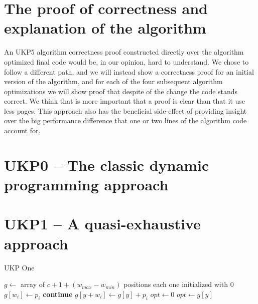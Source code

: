 \documentclass[12pt]{article}
\begin{document}
\section{The proof of correctness and explanation of the algorithm}

An UKP5 algorithm correctness proof constructed directly over the algorithm optimized final code would be, in our opinion, hard to understand. We chose to follow a different path, and we will instead show a correctness proof for an initial version of the algorithm, and for each of the four subsequent algorithm optimizations we will show proof that despite of the change the code stands correct. We think that is more important that a proof is clear than that it use less pages. This approach also has the beneficial side-effect of providing insight over the big performance difference that one or two lines of the algorithm code account for.

\section{UKP0 -- The classic dynamic programming approach}

\section{UKP1 -- A quasi-exhaustive approach}

\begin{algorithm}
\caption{UKP One}\label{alg:ukp1}
\begin{algorithmic}[1]
  \State \(g \gets\) array of \(c + 1 + (w_{max} - w_{min})\) positions each one initialized with \(0\)\label{ukp1:create_g}
  \State %
  \label{begin_trivial_bounds}
      \State \(g[w_i] \gets p_i\)
    \EndIf
  \EndFor\label{end_trivial_bounds}
  \State %
  \label{ukp1:main_ext_loop_begin}
    \label{ukp1:if_equal_to_zero}
    	\State \textbf{continue}
    \EndIf\label{ukp1:if_equal_to_zero}
    \State %
    \label{ukp1:main_inner_loop_begin}
      \label{ukp1:if_better_solution_begin}
        \State \(g[y + w_i] \gets g[y] + p_i\)
      \EndIf\label{ukp1:if_better_solution_end}
    \EndFor\label{ukp1:main_inner_loop_end}
  \EndFor\label{ukp1:main_ext_loop_end}
  \State %
  \State \(opt \gets 0\)
  \label{ukp1:opt_loop_begin}
    \label{ukp1:opt_loop_if}
      \State \(opt \gets g[y]\)
    \EndIf
  \EndFor\label{get_y_opt_loop_end}
\EndProcedure
\end{algorithmic}
\end{algorithm}
\end{document}
